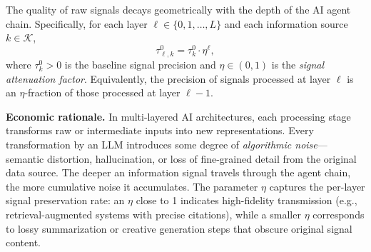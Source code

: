 %


\begin{assumption}\label{ass:diminishing_signal}
The quality of raw signals decays geometrically with the depth of the AI agent chain. Specifically, for each layer $\ell \in \{0, 1, \ldots, L\}$ and each information source $k \in \mathcal{K}$,
\begin{equation}\label{eq:diminishing_signal}
\tau^{0}_{\ell,k} = \tau^{0}_{k} \cdot \eta^{\ell},
\end{equation}
where $\tau^{0}_{k} > 0$ is the baseline signal precision and $\eta \in (0,1)$ is the \emph{signal attenuation factor}. Equivalently, the precision of signals processed at layer $\ell$ is an $\eta$-fraction of those processed at layer $\ell-1$.
\end{assumption}

\noindent \textbf{Economic rationale.} In multi-layered AI architectures, each processing stage transforms raw or intermediate inputs into new representations. Every transformation by an LLM introduces some degree of \emph{algorithmic noise}---semantic distortion, hallucination, or loss of fine-grained detail from the original data source. The deeper an information signal travels through the agent chain, the more cumulative noise it accumulates. The parameter $\eta$ captures the per-layer signal preservation rate: an $\eta$ close to 1 indicates high-fidelity transmission (e.g., retrieval-augmented systems with precise citations), while a smaller $\eta$ corresponds to lossy summarization or creative generation steps that obscure original signal content.

